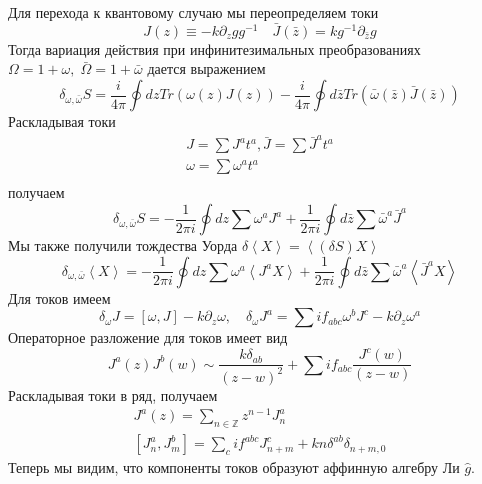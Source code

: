 \documentclass[a4paper,12pt]{article}
\theoremstyle{definition} \newtheorem{Def}{Definition}
\begin{document}
Для перехода к квантовому случаю мы переопределяем токи
\begin{equation}
  \label{eq:82}
  J(z)\equiv -k \partial_zg g^{-1}\quad \bar J(\bar z)=k g^{-1}\partial_{\bar z}g
\end{equation}
Тогда вариация действия при инфинитезимальных преобразованиях $\Omega=1+\omega,\; \bar \Omega =1+\bar \omega$ дается выражением
\begin{equation}
  \label{eq:83}
  \delta_{\omega,\bar\omega}S=\frac{i}{4\pi}\oint dz Tr (\omega(z)J(z))-\frac{i}{4\pi}\oint d\bar z Tr(\bar\omega(\bar z)\bar J(\bar z))
\end{equation}
Раскладывая токи
\begin{equation}
  \label{eq:85}
  \begin{aligned}
    J=\sum J^a t^a,\bar J=\sum \bar J^a t^a \\
    \omega=\sum \omega^a t^a\\
  \end{aligned}
\end{equation}
получаем
\begin{equation}
  \label{eq:86}
  \delta_{\omega,\bar \omega}S=-\frac{1}{2\pi i}\oint dz \sum\omega^a J^a+\frac{1}{2\pi i} \oint d\bar z \sum \bar \omega^a \bar J^a
\end{equation}
Мы также получили тождества Уорда $\delta\left< X\right>=\left<(\delta S)X\right>$
\begin{equation}
  \label{eq:87}
  \delta_{\omega,\bar \omega}\left< X \right>=-\frac{1}{2\pi i}\oint dz \sum\omega^a \left< J^a X\right>+
  \frac{1}{2\pi i} \oint d\bar z \sum \bar \omega^a \left< \bar J^a X\right>
\end{equation}
Для токов имеем
\begin{equation}
  \label{eq:88}
  \delta_{\omega}J=[\omega,J]-k\partial_z\omega,\quad \delta_{\omega}J^a=\sum i f_{abc}\omega^b J^c-k\partial_z\omega^a
\end{equation}
Операторное разложение для токов имеет вид
\begin{equation}
  \label{eq:89}
  J^a(z) J^b(w) \sim \frac{k\delta_{ab}}{(z-w)^2}+\sum i f_{abc}\frac{J^c(w)}{(z-w)}
\end{equation}
Раскладывая токи в ряд, получаем
\begin{equation}
  \label{eq:90}
  \begin{aligned}
    J^a(z)=\sum_{n\in \mathbb Z}z^{n-1}J^a_n\\
    \left[J^a_n,J^b_m\right]=\sum_c i f^{abc}J^c_{n+m}+kn\delta^{ab}\delta_{n+m,0}
  \end{aligned}
\end{equation}
Теперь мы видим, что компоненты токов образуют аффинную алгебру Ли $\hat g$.
\end{document}
